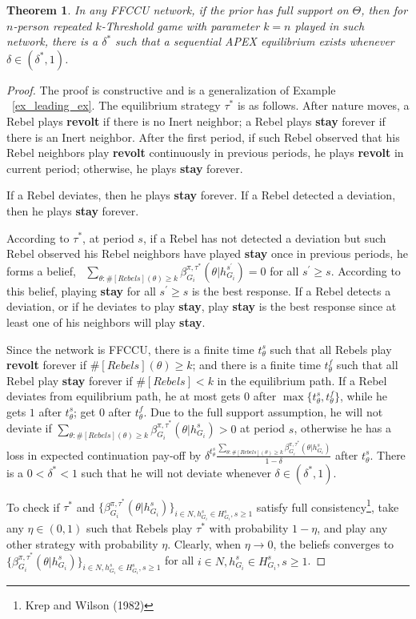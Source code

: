 \documentclass[12pt,letterpaper]{article}
\newtheorem*{main result}{Main Result}
\newtheorem{theorem}{Theorem}
\theoremstyle{definition}
\theoremstyle{remark}
\theoremstyle{claim}
\begin{document}
\begin{theorem}
\label{prop:not_crowded}
In any FFCCU network, if the prior has full support on $\Theta$, then for $n$-person repeated $k$-Threshold game with parameter $k=n$ played in such network,  there is a $\delta^{*}$ such that a sequential APEX equilibrium exists whenever $\delta\in (\delta^{*},1)$.
\end{theorem}
\begin{proof}
The proof is constructive and is a generalization of Example ~\ref{ex_leading_ex}. The equilibrium strategy $\tau^{*}$ is as follows. After nature moves, a Rebel plays \textbf{revolt}  if there is no Inert neighbor; a Rebel plays \textbf{stay} forever if there is an Inert neighbor. After the first period, if such Rebel observed that his Rebel neighbors play \textbf{revolt} continuously in previous periods, he plays \textbf{revolt} in current period; otherwise, he plays \textbf{stay} forever. 

If a Rebel deviates, then he plays \textbf{stay} forever. If a Rebel detected a deviation, then he plays \textbf{stay} forever.

According to $\tau^{*}$, at period $s$, if a Rebel has not detected a deviation but such Rebel observed his Rebel neighbors have played \textbf{stay} once in previous periods, he forms a belief, ~$\sum_{\theta:\#[Rebels](\theta)\geq k}\beta^{\pi,\tau^*}_{G_i}(\theta|h^{s^{'}}_{G_i})=0$ for all $s^{'}\geq s$. According to this belief, playing \textbf{stay} for all $s^{'} \geq s$ is the best response. If a Rebel detects a deviation, or if he deviates to play \textbf{stay}, play \textbf{stay} is the best response since at least one of his neighbors will play \textbf{stay}. 

Since the network is FFCCU, there is a finite time $t^{s}_{\theta}$ such that all Rebels play \textbf{revolt} forever if $\#[Rebels](\theta)\geq k$; and there is a finite time $t^f_{\theta}$ such that all Rebel play \textbf{stay} forever if $\#[Rebels]< k$ in the equilibrium path. If a Rebel deviates from equilibrium path, he at most gets 0 after $\max\{t^{s}_{\theta},t^f_{\theta}\}$, while he gets $1$ after $t^{s}_{\theta}$; get $0$ after $t^f_{\theta}$. Due to the full support assumption, he will not deviate if $\sum_{\theta:\#[Rebels](\theta)\geq k}\beta^{\pi,\tau^*}_{G_i}(\theta|h^{s}_{G_i})>0$ at period $s$, otherwise he has a loss in expected continuation pay-off by $\delta^{t^s_{\theta}}\frac{\sum_{\theta:\#[Rebels](\theta)\geq k}\beta^{\pi,\tau^*}_{G_i}(\theta|h^{s}_{G_i})}{1-\delta}$ after $t^s_{\theta}$. There is a $0<\delta^{*}<1$ such that he will not deviate whenever $\delta\in (\delta^{*},1)$.

To check if $\tau^{*}$ and $\{\beta^{\pi,\tau^*}_{G_i}(\theta|h^{s}_{G_i})\}_{i\in N, h^{s}_{G_i}\in H^{s}_{G_i},s\geq 1}$ satisfy full consistency\footnote{Krep and Wilson (1982)}, take any $\eta\in (0,1)$ such that Rebels play $\tau^{*}$ with probability $1-\eta$, and play any other strategy with probability $\eta$. Clearly, when $\eta \rightarrow 0$, the beliefs converges to $\{\beta^{\pi,\tau^*}_{G_i}(\theta|h^{s}_{G_i})\}_{i\in N, h^{s}_{G_i}\in H^{s}_{G_i},s\geq 1}$ for all $i\in N, h^{s}_{G_i}\in H^{s}_{G_i},s\geq 1$.
\end{proof}
\end{document}
